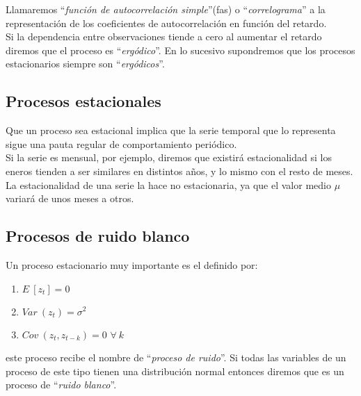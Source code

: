 Llamaremos ``\emph{funci\'on de autocorrelaci\'on simple}''(fas) o
``\emph{correlograma}'' a la representaci\'on de los coeficientes de
autocorrelaci\'on en funci\'on del retardo.\\

Si la dependencia entre observaciones tiende a cero al aumentar el retardo
diremos que el proceso es ``\emph{erg\'odico}''. En lo sucesivo supondremos
que los procesos estacionarios siempre son ``\emph{erg\'odicos}''.

\subsection{Procesos estacionales}

Que un proceso sea estacional implica que la serie temporal que lo representa
sigue una pauta regular de comportamiento peri\'odico.\\

Si la serie es mensual, por ejemplo, diremos que existir\'a estacionalidad si
los eneros tienden a ser similares en distintos a\~nos, y lo mismo con el resto
de meses. La estacionalidad de una serie la hace no estacionaria, ya que el
valor medio $\mu$ variar\'a de unos meses a otros.\\

\subsection{Procesos de ruido blanco}

Un proceso estacionario muy importante es el definido por:
\begin{enumerate}
\item $E\ [z_t] = 0$
\item $Var\ (z_t) = \sigma^2$
\item $Cov\ (z_t,z_{t-k})=0$ $\forall \ k$
\end{enumerate}
este proceso recibe el nombre de ``\emph{proceso de ruido}''. Si todas las
variables de un proceso de este tipo tienen una distribuci\'on normal entonces
diremos que es un proceso de ``\emph{ruido blanco}''.

\newpage
